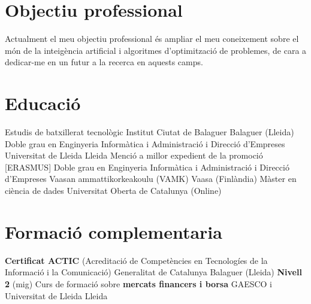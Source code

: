 \documentclass{cv}
\begin{document}
\makecvtitle

\section{Objectiu professional}
Actualment el meu objectiu professional és ampliar el meu coneixement
sobre el món de la inte\lgem igència artificial i algoritmes d'optimització
de problemes, de cara a dedicar-me en un futur a la recerca en aquests camps.

\section{Educació}
	{Estudis de batxillerat tecnològic}
	{Institut Ciutat de Balaguer}
	{Balaguer (Lleida)}
	{}
	{}
	{Doble grau en Enginyeria Informàtica i Administració i Direcció
		d'Empreses}
	{Universitat de Lleida}
	{Lleida}
	{Menció a millor expedient de la promoció}
	{}
	{[ERASMUS] Doble grau en Enginyeria Informàtica i
		Administració i Direcció d'Empreses}
	{Vaasan ammattikorkeakoulu (VAMK)}
	{Vaasa (Finlàndia)}
	{}
	{}
	{Màster en ciència de dades}
	{Universitat Oberta de Catalunya}
	{(Online)}
	{}
	{}

\section{Formació complementaria}
	{\textbf{Certificat ACTIC} (Acreditació de Competències en Tecnologíes de
		la Informació i la Comunicació)}
	{Generalitat de Catalunya}
	{Balaguer (Lleida)}
	{\textbf{Nivell 2} (mig)}
	{}
	{Curs de formació sobre \textbf{mercats financers i borsa}}
	{GAESCO i Universitat de Lleida}
	{Lleida}
	{}
	{}
	{}
\end{document}
